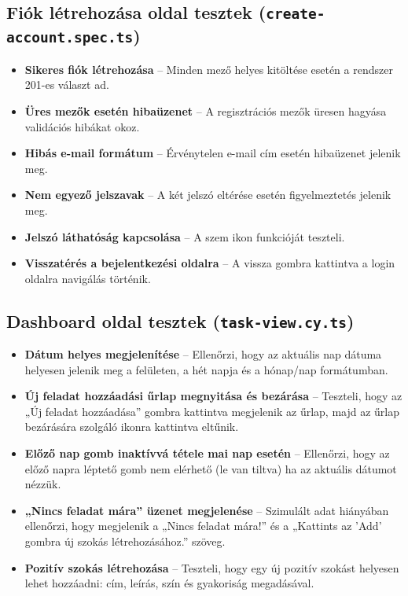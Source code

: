 \documentclass[12pt]{report}
\begin{document}
\subsection{Fiók létrehozása oldal tesztek (\texttt{create-account.spec.ts})}

\begin{itemize}
  \item \textbf{Sikeres fiók létrehozása} – Minden mező helyes kitöltése esetén a rendszer 201-es választ ad.
  \item \textbf{Üres mezők esetén hibaüzenet} – A regisztrációs mezők üresen hagyása validációs hibákat okoz.
  \item \textbf{Hibás e-mail formátum} – Érvénytelen e-mail cím esetén hibaüzenet jelenik meg.
  \item \textbf{Nem egyező jelszavak} – A két jelszó eltérése esetén figyelmeztetés jelenik meg.
  \item \textbf{Jelszó láthatóság kapcsolása} – A szem ikon funkcióját teszteli.
  \item \textbf{Visszatérés a bejelentkezési oldalra} – A vissza gombra kattintva a login oldalra navigálás történik.
\end{itemize}
\subsection{Dashboard oldal tesztek (\texttt{task-view.cy.ts})}

\begin{itemize}
  \item \textbf{Dátum helyes megjelenítése} – Ellenőrzi, hogy az aktuális nap dátuma helyesen jelenik meg a felületen, a hét napja és a hónap/nap formátumban.
  \item \textbf{Új feladat hozzáadási űrlap megnyitása és bezárása} – Teszteli, hogy az „Új feladat hozzáadása” gombra kattintva megjelenik az űrlap, majd az űrlap bezárására szolgáló ikonra kattintva eltűnik.
  \item \textbf{Előző nap gomb inaktívvá tétele mai nap esetén} – Ellenőrzi, hogy az előző napra léptető gomb nem elérhető (le van tiltva) ha az aktuális dátumot nézzük.
  \item \textbf{„Nincs feladat mára” üzenet megjelenése} – Szimulált adat hiányában ellenőrzi, hogy megjelenik a „Nincs feladat mára!” és a „Kattints az 'Add' gombra új szokás létrehozásához.” szöveg.
  \item \textbf{Pozitív szokás létrehozása} – Teszteli, hogy egy új pozitív szokást helyesen lehet hozzáadni: cím, leírás, szín és gyakoriság megadásával.
\end{itemize}
\end{document}
